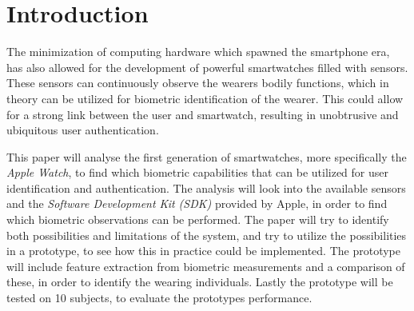 \section{Introduction}
The minimization of computing hardware which spawned the smartphone era, has also
allowed for the development of powerful smartwatches filled with sensors.
These sensors can continuously observe the wearers bodily functions, which in 
theory can be utilized for biometric identification of the wearer.
This could allow for a strong link between the user and smartwatch, resulting in
unobtrusive and ubiquitous user authentication. %

This paper will analyse the first generation of smartwatches, more specifically
the \textit{Apple Watch}, to find which biometric capabilities that can be
utilized for user identification and authentication. The analysis will look into
the available sensors and the \textit{Software Development Kit (SDK)} provided 
by Apple, in order to find which biometric observations can be performed. The
paper will try to identify both possibilities and limitations of the system, and
try to utilize the possibilities in a prototype, to see how this in practice
could be implemented. The prototype will include feature extraction from
biometric measurements and a comparison of these, in order to identify the
wearing individuals. Lastly the prototype will be tested on 10 subjects, to
evaluate the prototypes performance.
